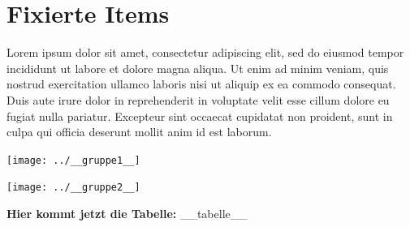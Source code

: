 \documentclass[11pt]{article}
\begin{document}
\newpage
\section{Fixierte Items}
\label{sec: Gesamtbeurteilung}
Lorem ipsum dolor sit amet, consectetur adipiscing elit, sed do eiusmod tempor incididunt ut labore et dolore magna aliqua. Ut enim ad minim veniam, quis nostrud exercitation ullamco laboris nisi ut aliquip ex ea commodo consequat. Duis aute irure dolor in reprehenderit in voluptate velit esse cillum dolore eu fugiat nulla pariatur. Excepteur sint occaecat cupidatat non proident, sunt in culpa qui officia deserunt mollit anim id est laborum.
\bigskip

\texttt{[image: ../\_\_gruppe1\_\_]}

\texttt{[image: ../\_\_gruppe2\_\_]}

\noindent
\textbf{Hier kommt jetzt die Tabelle:}
__tabelle__
\end{document}
